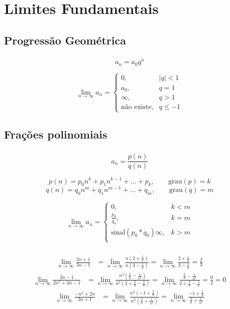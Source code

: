 \documentclass[10 pt]{beamer}
\newcommand{\myframe}[1]{
\begin{frame}
 \frametitle{\insertsection \qquad {\small \insertsubsection}}
#1
\end{frame}}
\newcommand{\limninf}{\lim_{n\rightarrow\infty}}
\begin{document}
\section{Limites Fundamentais}

\subsection{Progressão Geométrica}

\myframe {
  $$a_n = a_0q^n$$

  $$ \limninf a_n = \left\{
    \begin{array}{ll}
      0, & \vert{q}\vert < 1 \\
      a_0, & q = 1 \\
      \infty, & q > 1 \\
      \mbox{não existe}, & q \leq -1
    \end{array}
    \right. $$
}

\subsection{Frações polinomiais}

\myframe {
  $$ a_n = \frac{p(n)}{q(n)} $$

  $$ p(n) = p_0n^k + p_1n^{k-1} + \dots + p_k, \qquad \mbox{grau}(p) = k $$
  $$ q(n) = q_0n^m + q_1n^{m-1} + \dots + q_m, \qquad \mbox{grau}(q) = m $$
  
  $$ \limninf a_n = \left\{
    \begin{array}{ll}
      0, & k < m \\ 
      \frac{p_0}{q_0}, & k = m \\
      \mbox{sinal}(p_0*q_0)\infty, & k > m \\
    \end{array}
    \right. $$
}

\myframe {
  \begin{align*}
    \limninf \frac{2n + 1}{3n - 1} & =
      \limninf \frac{n(2 + \frac{1}{n})}{n(3 - \frac{1}{n})} =
      \limninf \frac{2 + \frac{1}{n}}{3 - \frac{1}{n}} = \frac{2}{3}
  \end{align*}
  \vspace{0.5 cm}
  \begin{align*}
    \limninf \frac{2n - 1}{2n^2 + 3n - 1} & =
      \limninf \frac{n^2(\frac{2}{n} - \frac{1}{n^2})}{n^2(2 + \frac{3}{n} - \frac{1}{n})} =
      \limninf \frac{\frac{2}{n} - \frac{1}{n^2}}{2+\frac{3}{n}-\frac{1}{n}} = \frac{0}{2} = 0
  \end{align*}
  \vspace{0.5 cm}
  \begin{align*}
    \limninf \frac{-n^2 + 2n}{3n + 1} & =
      \limninf \frac{n^2(-1 + \frac{2}{n})}{n^2(\frac{3}{n}+\frac{1}{n^2})} =
      \limninf \frac{-1+\frac{2}{n}}{\frac{3}{n}+\frac{1}{n^2}}
  \end{align*}
}
\end{document}
